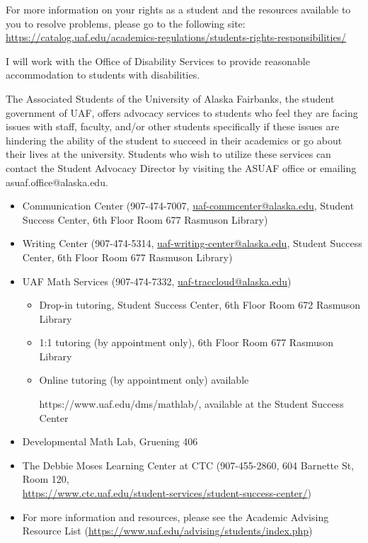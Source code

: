\documentclass[12pt]{article}
\def\mailto#1{\href{mailto:#1}{#1}}
\begin{document}
For more information on your rights as a student and the resources available to you to resolve problems, please go to the following site:\\ \url{https://catalog.uaf.edu/academics-regulations/students-rights-responsibilities/}

 I will work with the Office of Disability Services to provide reasonable accommodation to students with disabilities.

 The Associated Students of the University of Alaska Fairbanks, the student government of UAF, offers advocacy services to students who feel they are facing issues with staff, faculty, and/or other students specifically if these issues are hindering the ability of the student to succeed in their academics or go about their lives at the university. Students who wish to utilize these services can contact the Student Advocacy Director by visiting the ASUAF office or emailing asuaf.office@alaska.edu. 



\begin{itemize}
\setlength\itemsep{0em}
        \item Communication Center (907-474-7007, \mailto{uaf-commcenter@alaska.edu}, Student Success Center, 6th Floor Room 677 Rasmuson Library)
        \item Writing Center (907-474-5314, \mailto{uaf-writing-center@alaska.edu}, Student Success Center, 6th Floor Room 677 Rasmuson Library)
\item UAF Math Services (907-474-7332, \mailto{uaf-traccloud@alaska.edu})


\begin{itemize}
\item Drop-in tutoring, Student Success Center, 6th Floor Room 672 Rasmuson Library

\item 1:1 tutoring (by appointment only), 6th Floor Room 677 Rasmuson Library

\item Online tutoring (by appointment only) available

https://www.uaf.edu/dms/mathlab/, available at the Student Success Center
\end{itemize}

\item Developmental Math Lab, Gruening 406
\item The Debbie Moses Learning Center at CTC (907-455-2860, 604 Barnette St, Room 120,\\ \url{https://www.ctc.uaf.edu/student-services/student-success-center/})
\item For more information and resources, please see the Academic Advising Resource List (\url{https://www.uaf.edu/advising/students/index.php})
\end{itemize}
\end{document}
